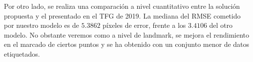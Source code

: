 \medskip

\noindent Por otro lado, se realiza una comparación a nivel cuantitativo entre la solución propuesta y el presentado en el TFG de 2019. La mediana del RMSE cometido por nuestro modelo es de $5.3862$ píxeles de error, frente a los $3.4106$ del otro modelo. No obstante veremos como a nivel de landmark, se mejora el rendimiento en el marcado de ciertos puntos y se ha obtenido con un conjunto menor de datos etiquetados.

\endinput
